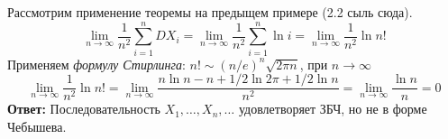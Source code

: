 \begin{slv} Рассмотрим применение теоремы на предыщем примере (2.2 сыль сюда).
	\[
		\lim\limits_{n \to \infty} \frac{1}{n^2} \sum_{i = 1}^{n} DX_i = \lim\limits_{n \to \infty} \frac{1}{n^2} \sum_{i = 1}^{n} \ln i = \lim\limits_{n \to \infty} \frac{1}{n^2} \ln n!
	\]
	Применяем \textit{формулу Стирлинга}: $n! \sim (n/e)^n \sqrt{2 \pi n}$, при $n \to \infty$
	\[
		\lim\limits_{n \to \infty} \frac{1}{n^2} \ln n! = \lim\limits_{n \to \infty} \frac{n \ln n - n + 1/2 \ln 2 \pi + 1/2 \ln n}{n^2} = \lim\limits_{n \to \infty} \frac{\ln n}{n} = 0
	\]
	\textbf{Ответ:} Последовательность $X_1, \dots, X_n, \dots$ удовлетворяет ЗБЧ, но не в форме Чебышева.
\end{slv}
